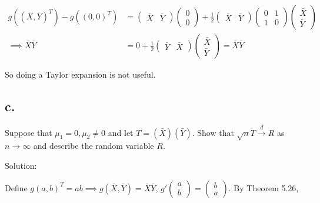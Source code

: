 \documentclass[
  letterpaper,
  DIV=11,
  numbers=noendperiod]{scrreprt}
\begin{document}
\[\begin{aligned}
g((\bar X,  \bar Y)^T) - g((0,0)^T) &=  \begin{pmatrix} \bar X  & \bar Y \end{pmatrix} \begin{pmatrix} 0 \\ 0 \end{pmatrix} + \frac 1 2 \begin{pmatrix} \bar X & \bar Y\end{pmatrix} \begin{pmatrix} 0 & 1 \\ 1 & 0 \end{pmatrix} \begin{pmatrix} \bar X  \\ \bar Y \end{pmatrix} \\
\implies \bar X \bar Y &= 0 + \frac 1 2 \begin{pmatrix} \bar Y & \bar X\end{pmatrix} \begin{pmatrix} \bar X  \\ \bar Y \end{pmatrix} =  \bar X \bar Y
\end{aligned}\]

So doing a Taylor expansion is not useful.

\hypertarget{c.-2}{%
\subsection{c.}\label{c.-2}}

Suppose that \(\mu_1 = 0, \mu_2 \neq 0\) and let
\(T = (\bar X) (\bar Y)\). Show that \(\sqrt n T \overset d \to R\) as
\(n \to \infty\) and describe the random variable \(R\).

Solution:

Define \(g (a , b)^T = ab \implies g( \bar X, \bar Y)= \bar X \bar Y\),
\(g'\begin{pmatrix} a\\ b \end{pmatrix} = \begin{pmatrix} b \\ a \end{pmatrix}\).
By Theorem 5.26,
\end{document}
